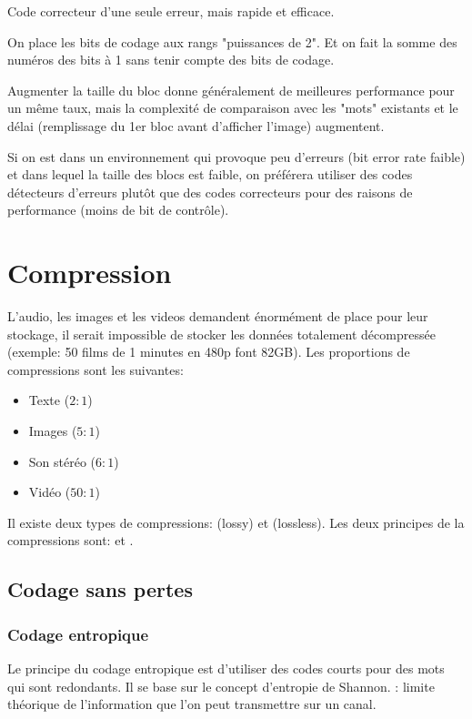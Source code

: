 Code correcteur d'une seule erreur, mais rapide et efficace.

On place les bits de codage aux rangs "puissances de 2". Et on fait la somme des numéros des bits à 1 sans tenir compte des bits de codage.

Augmenter la taille du bloc donne généralement de meilleures performance pour un même taux, mais la complexité de comparaison avec les "mots" existants et le délai (remplissage du 1er bloc avant d'afficher l'image) augmentent.

Si on est dans un environnement qui provoque peu d'erreurs (bit error rate faible) et dans lequel la taille des blocs est faible, on préférera utiliser des codes détecteurs d'erreurs plutôt que des codes correcteurs pour des raisons de performance (moins de bit de contrôle).

\chapter{Compression}

L'audio, les images et les videos demandent énormément de place pour leur stockage, il serait impossible de stocker les données totalement décompressée (exemple: 50 films de 1 minutes en 480p font 82GB). Les proportions de compressions sont les suivantes:
\begin{itemize}
\item Texte ($2:1$)
\item Images ($5:1$)
\item Son stéréo ($6:1$)
\item Vidéo ($50:1$)
\end{itemize}

Il existe deux types de compressions:  (lossy) et  (lossless). Les deux principes de la compressions sont:  et .

\section{Codage sans pertes}

\subsection{Codage entropique}

Le principe du codage entropique est d'utiliser des codes courts pour des mots qui sont redondants. Il se base sur le concept d'entropie de Shannon.
 : limite théorique de l'information que l'on peut transmettre sur un canal.

